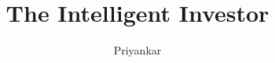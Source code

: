 \documentclass{notestyle}
\title{The Intelligent Investor}
\author{Priyankar}
\begin{document}
\maketitle
\tableofcontents
\clearpage










\nocite{*}
\end{document}
